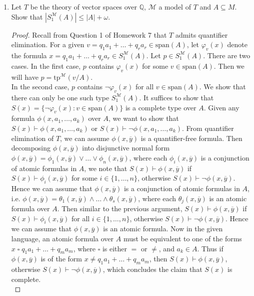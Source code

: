 \documentclass{article}
\begin{document}
\begin{enumerate}[label={\bf Q\arabic*:}]
  \item Let $T$ be the theory of vector spaces over $\mathbb{Q}$,
    $\mathcal{M}$ a model of $T$ and $A\subseteq M$. Show that
    $|S^{\mathcal{M}}_1(A)|\leq|A|+\omega$.

    \begin{proof}
      Recall from Question 1 of Homework 7 that $T$ admits quantifier
      elimination. For a given $v=q_1a_1+\ldots+q_ra_r\in\text{span}(A)$,
      let $\varphi_v(x)$ denote the formula $x=q_1a_1+\ldots+q_ra_r\in
      S^\mathcal{M}_1(A)$. Let $p\in S^\mathcal{M}_1(A)$. There are two
      cases. In the first case, $p$ contains $\varphi_v(x)$ for some
      $v\in\text{span}(A)$. Then we will have
      $p=\text{tp}^\mathcal{M}(v/A)$. \\

      In the second case, $p$ contains $\neg\varphi_v(x)$ for all
      $v\in\text{span}(A)$. We show that there can only be one such type
      $S^\mathcal{M}_1(A)$. It suffices to show that
      $S(x)=\{\neg\varphi_v(x): v\in\text{span}(A)\}$ is a complete type
      over $A$. Given any formula $\phi(x,a_1,\ldots,a_k)$ over $A$, we
      want to show that $S(x)\vdash\phi(x,a_1,\ldots,a_k)$ or
      $S(x)\vdash\neg\phi(x,a_1,\ldots,a_k)$. From quantifier elimination
      of $T$, we can assume $\phi(x,\overline{y})$ is a quantifier-free
      formula. Then decomposing $\phi(x,\overline{y})$ into disjunctive
      normal form $\phi(x,\overline{y})=
      \phi_1(x,\overline{y})\vee\ldots\vee\phi_n(x,\overline{y})$, where
      each $\phi_i(x,\overline{y})$ is a conjunction of atomic formulas in
      $A$, we note that $S(x)\vdash\phi(x,\overline{y})$ if
      $S(x)\vdash\phi_i(x,\overline{y})$ for some $i\in\{1,\ldots,n\}$,
      otherwise $S(x)\vdash\neg\phi(x,\overline{y})$.  Hence we can assume
      that $\phi(x,\overline{y})$ is a conjunction of atomic formulas in
      $A$, i.e. $\phi(x,\overline{y})=
      \theta_1(x,\overline{y})\wedge\ldots\wedge\theta_s(x,\overline{y})$,
      where each $\theta_j(x,\overline{y})$ is an atomic formula over $A$.
      Then similar to the previous argument,
      $S(x)\vdash\phi(x,\overline{y})$ if
      $S(x)\vdash\phi_i(x,\overline{y})$ for all $i\in\{1,\ldots,n\}$,
      otherwise $S(x)\vdash\neg\phi(x,\overline{y})$. Hence we can assume
      that $\phi(x,\overline{y})$ is an atomic formula.  Now in the given
      language, an atomic formula over $A$ must be equivalent to one of the
      forms $x\;\square\;q_1a_1+\ldots+q_ma_m$, where $\square$ is either
      $=$ or $\neq$, and $a_k\in A$. Thus if $\phi(x,\overline{y})$ is of
      the form $x\neq q_1a_1+\ldots+q_ma_m$, then
      $S(x)\vdash\phi(x,\overline{y})$, otherwise
      $S(x)\vdash\neg\phi(x,\overline{y})$, which concludes the claim that
      $S(x)$ is complete. \\


\end{proof}
\end{enumerate}
\end{document}
